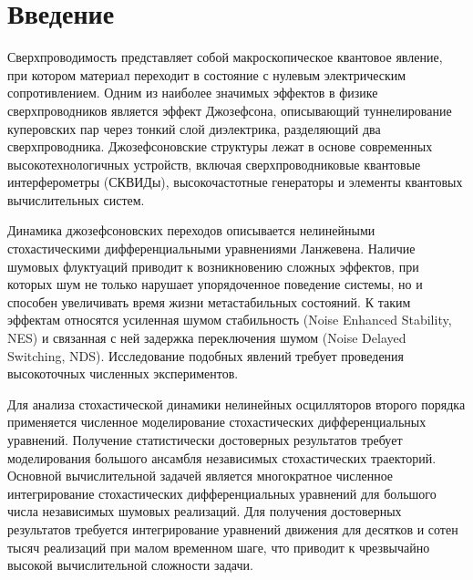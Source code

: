 
\usepackage{tikz}
\usetikzlibrary{arrows.meta,positioning}





\renewcommand{\contentsname}{Содержание}
\newpage
\tableofcontents


\newpage

\newpage
\section*{Введение}

Сверхпроводимость представляет собой макроскопическое квантовое явление, при котором материал переходит в состояние с нулевым электрическим сопротивлением. Одним из наиболее значимых эффектов в физике сверхпроводников является эффект Джозефсона, описывающий туннелирование куперовских пар через тонкий слой диэлектрика, разделяющий два сверхпроводника. Джозефсоновские структуры лежат в основе современных высокотехнологичных устройств, включая сверхпроводниковые квантовые интерферометры (СКВИДы), высокочастотные генераторы и элементы квантовых вычислительных систем.

Динамика джозефсоновских переходов описывается нелинейными стохастическими дифференциальными уравнениями Ланжевена. Наличие шумовых флуктуаций приводит к возникновению сложных эффектов, при которых шум не только нарушает упорядоченное поведение системы, но и способен увеличивать время жизни метастабильных состояний. К таким эффектам относятся усиленная шумом стабильность (Noise Enhanced Stability, NES) и связанная с ней задержка переключения шумом (Noise Delayed Switching, NDS). Исследование подобных явлений требует проведения высокоточных численных экспериментов.

Для анализа стохастической динамики нелинейных осцилляторов второго порядка применяется численное моделирование стохастических дифференциальных уравнений. Получение статистически достоверных результатов требует моделирования большого ансамбля независимых стохастических траекторий. Основной вычислительной задачей является многократное численное интегрирование стохастических дифференциальных уравнений для большого числа независимых шумовых реализаций. Для получения достоверных результатов требуется интегрирование уравнений движения для десятков и сотен тысяч реализаций при малом временном шаге, что приводит к чрезвычайно высокой вычислительной сложности задачи.


